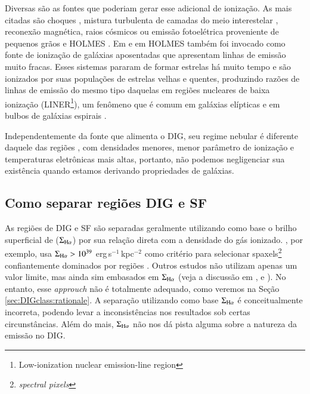 Diversas são as fontes que poderiam gerar esse adicional de ionização. As mais citadas são choques \citep{CollinsRand.2001}, mistura turbulenta de camadas do meio interestelar \citep{SlavinShullBegelman.1993, Binette.etal.2009a}, reconexão magnética, raios cósmicos ou emissão fotoelétrica proveniente de pequenos grãos \citep{Reynolds.etal.2001} e HOLMES \citep{FloresFajardo.etal.2011a}. Em \citet{Stasinska.etal.2008a} e em \citet[][daqui por diante CF11]{CidFernandes.etal.2011a} HOLMES também foi invocado como fonte de ionização de galáxias aposentadas que apresentam linhas de emissão muito fracas. Esses sistemas pararam de formar estrelas há muito tempo e são ionizados por suas populações de estrelas velhas e quentes, produzindo razões de linhas de emissão do mesmo tipo daquelas em regiões nucleares de baixa ionização (LINER\footnote{Low-ionization nuclear emission-line region}), um fenômeno que é comum em galáxias elípticas e em bulbos de galáxias espirais \citep{Sarzi.etal.2010, Gomes.etal.2016a, Belfiore.etal.2016}.

Independentemente da fonte que alimenta o DIG, seu regime nebular é diferente daquele das regiões \hii, com densidades menores, menor parâmetro de ionização e temperaturas eletrônicas mais altas, portanto, não podemos negligenciar sua existência quando estamos derivando propriedades de galáxias.

\subsection{Como separar regiões DIG e SF}
\label{sec:intro:DIG:class}
As regiões de DIG e SF são separadas geralmente utilizando como base o brilho superficial de \Ha ($\Sigma_{\Ha}$) por sua relação direta com a densidade do gás ionizado. \citet{Zhang.etal.2017a}, por exemplo, usa $\Sigma_{\Ha} > 10^{39}$ erg$\,$s$^{-1}\,$kpc$^{-2}$ como critério para selecionar spaxels\footnote{\em spectral pixels} confiantemente dominados por regiões \hii. Outros estudos não utilizam apenas um valor limite, mas ainda sim embasados em $\Sigma_{\Ha}$ (veja a discussão em \citealt{Zurita.etal.2000}, \citealt{Oey.etal.2007} e \citealt{Vogt.etal.2017a}). No entanto, esse {\em approuch} não é totalmente adequado, como veremos na Seção \ref{sec:DIGclass:rationale}. A separação utilizando como base $\Sigma_{\Ha}$ é conceitualmente incorreta, podendo levar a inconsistências nos resultados sob certas circunstâncias. Além do mais, $\Sigma_{\Ha}$ não nos dá pista alguma sobre a natureza da emissão no DIG.


